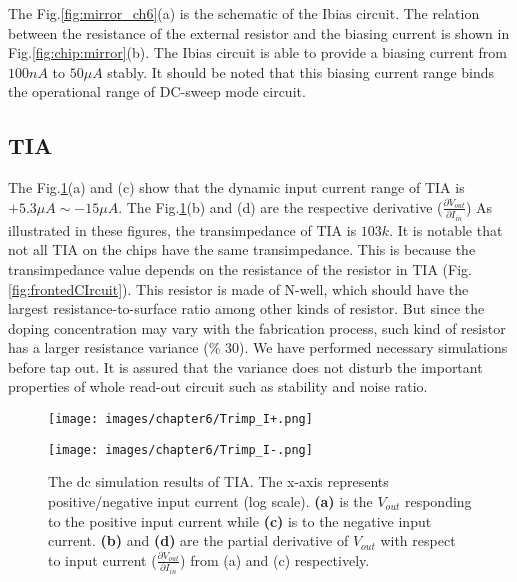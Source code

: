 The Fig.\ref{fig:mirror_ch6}(a) is the schematic of the Ibias circuit.
The relation between the resistance of the external resistor and the biasing current is shown in Fig.\ref{fig:chip:mirror}(b).
The Ibias circuit is able to provide a biasing current from $100n A$ to $50\mu A$ stably.
It should be noted that this biasing current range binds the operational range of DC-sweep mode circuit.

\FloatBarrier
\subsection{TIA}
The Fig.\ref{fig:chip:TIA}(a) and (c) show that the dynamic input current range of TIA is $+5.3\mu A \sim -15\mu A$.
The Fig.\ref{fig:chip:TIA}(b) and (d) are the respective derivative ($\frac{\partial V_{out}}{\partial I_{in}}$)
As illustrated in these figures, the transimpedance of TIA is $103k$.
It is notable that not all TIA on the chips have the same transimpedance.
This is because the transimpedance value depends on the resistance of the resistor in TIA (Fig.\ref{fig:frontedCIrcuit}).
This resistor is made of N-well, which should have the largest resistance-to-surface ratio among other kinds of resistor.
But since the doping concentration may vary with the fabrication process, such kind of resistor has a larger resistance variance (\% 30).
We have performed necessary simulations before tap out.
It is assured that the variance does not disturb the important properties of whole read-out circuit such as stability and noise ratio.

\begin{figure}[tbh!]
    \centering
    \begin{minipage}[t]{0.8\textwidth}
        \texttt{[image: images/chapter6/Trimp\_I+.png]}
        \raggedleft
    \end{minipage}
    \hfill
    \centering
    \begin{minipage}[t]{0.8\textwidth}
        \texttt{[image: images/chapter6/Trimp\_I-.png]}
        \raggedleft
    \end{minipage}
    \caption{The dc simulation results of TIA. The x-axis represents positive/negative input current (log scale). \textbf{(a)} is the $V_{out}$ responding to the positive input current while \textbf{(c)} is to the negative input current.
                    \textbf{(b)} and \textbf{(d)} are the partial derivative of $V_{out}$ with respect to input current ($\frac{\partial V_{out}}{\partial {I_{in}}}$) from (a) and (c) respectively.}
    \label{fig:chip:TIA}
\end{figure}




